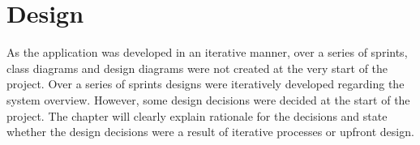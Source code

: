 \chapter{Design}







As the application was developed in an iterative manner, over a series of sprints, class diagrams and design diagrams were not created at the very start of the project. Over a series of sprints designs were iteratively developed regarding the system overview. However, some design decisions were decided at the start of the project. The chapter will clearly explain rationale for the decisions and state whether the design decisions were a result of iterative processes or upfront design.

